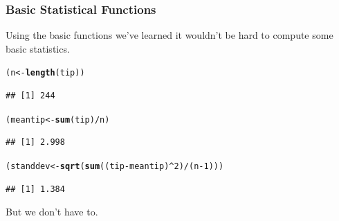 \documentclass{beamer}\usepackage[]{graphicx}\usepackage[]{color}
\makeatletter
\newcommand{\hlnum}[1]{\textcolor[rgb]{0.686,0.059,0.569}{#1}}%
\newcommand{\hlopt}[1]{\textcolor[rgb]{0,0,0}{#1}}%
\newcommand{\hlstd}[1]{\textcolor[rgb]{0.345,0.345,0.345}{#1}}%
\newcommand{\hlkwb}[1]{\textcolor[rgb]{0.69,0.353,0.396}{#1}}%
\newcommand{\hlkwd}[1]{\textcolor[rgb]{0.737,0.353,0.396}{\textbf{#1}}}%
\newenvironment{kframe}{%
 \def\at@end@of@kframe{}%
 \ifinner\ifhmode%
  \def\at@end@of@kframe{\end{minipage}}%
  \begin{minipage}{\columnwidth}%
 \fi\fi%
 \def\FrameCommand##1{\hskip\@totalleftmargin \hskip-\fboxsep
 \colorbox{shadecolor}{##1}\hskip-\fboxsep
     \hskip-\linewidth \hskip-\@totalleftmargin \hskip\columnwidth}%
 \MakeFramed {\advance\hsize-\width
   \@totalleftmargin\z@ \linewidth\hsize
   \@setminipage}}%
 {\par\unskip\endMakeFramed%
 \at@end@of@kframe}
\newenvironment{knitrout}{}{} %
\makeatother
\begin{document}


\begin{frame}[fragile]
    \frametitle{Basic Statistical Functions}
Using the basic functions we've learned it wouldn't be hard to compute some basic statistics.
\begin{knitrout}\footnotesize
{}\color{fgcolor}\begin{kframe}
\begin{alltt}
\hlstd{(n} \hlkwb{<-} \hlkwd{length}\hlstd{(tip))}
\end{alltt}
\begin{verbatim}
## [1] 244
\end{verbatim}
\begin{alltt}
\hlstd{(meantip} \hlkwb{<-} \hlkwd{sum}\hlstd{(tip)}\hlopt{/}\hlstd{n)}
\end{alltt}
\begin{verbatim}
## [1] 2.998
\end{verbatim}
\begin{alltt}
\hlstd{(standdev} \hlkwb{<-} \hlkwd{sqrt}\hlstd{(}\hlkwd{sum}\hlstd{((tip} \hlopt{-} \hlstd{meantip)}\hlopt{^}\hlnum{2}\hlstd{)}\hlopt{/}\hlstd{(n} \hlopt{-} \hlnum{1}\hlstd{)))}
\end{alltt}
\begin{verbatim}
## [1] 1.384
\end{verbatim}
\end{kframe}
\end{knitrout}

But we don't have to.
\end{frame}
\end{document}
